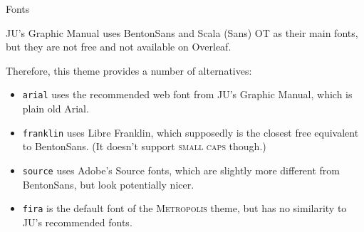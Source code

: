 \documentclass[10pt]{beamer}
\begin{document}
\begin{frame}[fragile,label=selectfonts]{Fonts}

JU's Graphic Manual uses \alert{BentonSans} and \alert{Scala (Sans) OT} as their main fonts, but they are not free and not available on Overleaf.\medskip

  Therefore, this theme provides a number of alternatives:
  
      \begin{itemize}
        \item \alert{\texttt{arial}} uses the recommended web font from JU's Graphic Manual, which is plain old Arial.
        \item \alert{\texttt{franklin}} uses Libre Franklin, which supposedly is the closest free equivalent to BentonSans.  (It doesn't support \textsc{small caps} though.)
        \item \alert{\texttt{source}} uses Adobe's Source fonts, which are slightly more different from BentonSans, but look potentially nicer.
        \item \alert{\texttt{fira}} is the default font of the \textsc{Metropolis} theme, but has no similarity to JU's recommended fonts.
    \end{itemize}
\end{frame}
\end{document}
